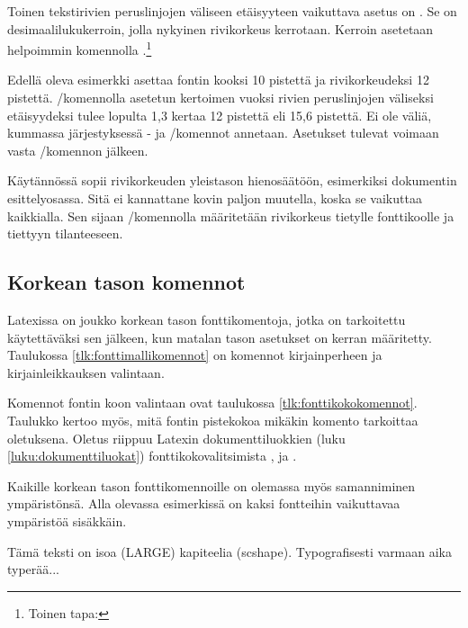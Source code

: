 Toinen tekstirivien peruslinjojen väliseen etäisyyteen vaikuttava asetus
on . Se on desimaalilukukerroin, jolla
nykyinen rivikorkeus kerrotaan. Kerroin asetetaan helpoimmin komennolla
.\footnote{Toinen tapa: }

\begin{koodilohkosis}
  \fontsize{10pt}{12pt} \linespread{1.3} \selectfont
\end{koodilohkosis}

Edellä oleva esimerkki asettaa fontin kooksi 10 pistettä ja
rivikorkeudeksi 12 pistettä. \-/komennolla
asetetun kertoimen vuoksi rivien peruslinjojen väliseksi etäisyydeksi
tulee lopulta 1,3 kertaa 12 pistettä eli 15,6 pistettä. Ei ole väliä,
kummassa järjestyksessä - ja \-/komennot annetaan. Asetukset tulevat voimaan vasta
\-/komennon jälkeen.

Käytännössä  sopii rivikorkeuden yleistason
hienosäätöön, esimerkiksi dokumentin esittely\-osassa. Sitä ei
kannattane kovin paljon muutella, koska se vaikuttaa kaikkialla. Sen
sijaan \-/komennolla määritetään rivikorkeus
tietylle fonttikoolle ja tiettyyn tilanteeseen.

\subsection{Korkean tason komennot}
\label{luku:fontit_korkea}

Latexissa on joukko korkean tason fontti\-komentoja, jotka on
tarkoitettu käytettäväksi sen jälkeen, kun matalan tason asetukset on
kerran määritetty. Taulukossa \ref{tlk:fonttimallikomennot} on komennot
kirjainperheen ja kirjainleikkauksen valintaan.

Komennot fontin koon valintaan ovat taulukossa
\ref{tlk:fonttikokokomennot}. Taulukko kertoo myös, mitä fontin
pistekokoa mikäkin komento tarkoittaa oletuksena. Oletus riippuu Latexin
dokumenttiluokkien (luku \ref{luku:dokumenttiluokat})
fonttikokovalitsimista \koodi{10pt}, \koodi{11pt} ja \koodi{12pt}.

Kaikille korkean tason fonttikomennoille on olemassa myös samanniminen
ympäristönsä. Alla olevassa esimerkissä on kaksi fontteihin vaikuttavaa
ympäristöä sisäkkäin.

\begin{koodilohkosis}
  \begin{LARGE}
    \begin{scshape}
      Tämä teksti on isoa (LARGE) kapiteelia (scshape).
      Typografisesti varmaan aika typerää...
    \end{scshape}
  \end{LARGE}
\end{koodilohkosis}

